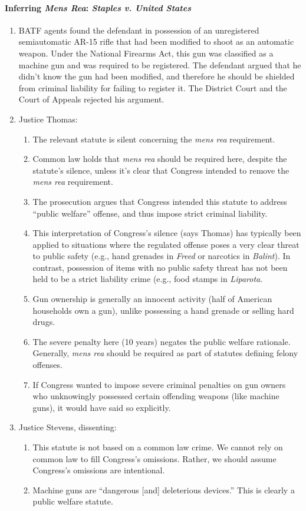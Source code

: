 \paragraph{Inferring \emph{Mens Rea}: \emph{Staples v. United States}}

\begin{enumerate}
    \item BATF agents found the defendant in possession of an unregistered semiautomatic AR-15 rifle that had been modified to shoot as an automatic weapon. Under the National Firearms Act, this gun was classified as a machine gun and was required to be registered. The defendant argued that he didn't know the gun had been modified, and therefore he should be shielded from criminal liability for failing to register it. The District Court and the Court of Appeals rejected his argument.
    \item Justice Thomas:
    \begin{enumerate}
        \item The relevant statute is silent concerning the \emph{mens rea} requirement.
        \item Common law holds that \emph{mens rea} should be required here, despite the statute's silence, unless it's clear that Congress intended to remove the \emph{mens rea} requirement.
        \item The prosecution argues that Congress intended this statute to address ``public welfare'' offense, and thus impose strict criminal liability.
        \item This interpretation of Congress's silence (says Thomas) has typically been applied to situations where the regulated offense poses a very clear threat to public safety (e.g., hand grenades in \emph{Freed} or narcotics in \emph{Balint}). In contrast, possession of items with no public safety threat has not been held to be a strict liability crime (e.g., food stamps in \emph{Liparota}.
        \item Gun ownership is generally an innocent activity (half of American households own a gun), unlike possessing a hand grenade or selling hard drugs.
        \item The severe penalty here (10 years) negates the public welfare rationale. Generally, \emph{mens rea} should be required as part of statutes defining felony offenses.
        \item If Congress wanted to impose severe criminal penalties on gun owners who unknowingly possessed certain offending weapons (like machine guns), it would have said so explicitly.
    \end{enumerate}
    \item Justice Stevens, dissenting:
    \begin{enumerate}
        \item This statute is not based on a common law crime. We cannot rely on common law to fill Congress's omissions. Rather, we should assume Congress's omissions are intentional.
        \item Machine guns are ``dangerous [and] deleterious devices.'' This is clearly a public welfare statute.
    \end{enumerate}
\end{enumerate}

